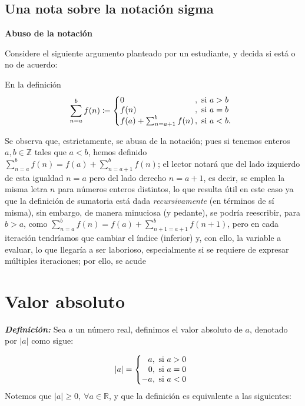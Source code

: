\documentclass[11pt]{article}
\newcommand{\Z}{\mathbb{Z}}
\newcommand{\R}{\mathbb{R}}
\newcommand{\defined}{\coloneqq}
\newcommand{\bfit}[1]{\textbf{\textit{#1}}}
\begin{document}
\subsection*{Una nota sobre la notación sigma}

\textbf{Abuso de la notación}

Considere el siguiente argumento planteado por un estudiante, y decida si está o no de acuerdo:

En la definición     \[
  \sum_{n=a}^{b} f(n) \defined \left\{
 \begin{array}{@{}l@{\thinspace}l}
  0 &,  \ \text{si}  \ a>b\\
  f(n) &,  \ \text{si}  \ a=b\\
  f(a) + \sum_{n=a+1}^{b} f(n) &,  \ \text{si}  \ a<b.
 \end{array} \right. \]

Se observa que, estrictamente, se abusa de la notación; pues si tenemos enteros $a,b\in \Z$ tales que $a<b$, hemos definido $\sum_{n=a}^{b} f(n) = f(a) + \sum_{n=a+1}^{b}f(n)$; el lector notará que del lado izquierdo de esta igualdad $n=a$ pero del lado derecho $n=a+1$, es decir, se emplea la misma letra $n$ para números enteros distintos, lo que resulta útil en este caso ya que la definición de sumatoria está dada \textit{recursivamente} (en términos de sí misma), sin embargo, de manera minuciosa (y pedante), se podría reescribir, para $b>a$, como $\sum_{n=a}^{b}f(n) = f(a) + \sum_{n+1=a+1}^{b}f(n+1)$, pero en cada iteración tendríamos que cambiar el índice (inferior) y, con ello, la variable a evaluar, lo que llegaría a ser laborioso, especialmente si se requiere de expresar múltiples iteraciones; por ello, se acude %

\section*{Valor absoluto}

\bfit{Definición:}  Sea $a$ un número real, definimos el valor absoluto de $a$, denotado por $|a|$ como sigue:

 \[
  |a| = \left\{
 \begin{array}{@{}r@{\thinspace}l}
  a, &  \ \text{si}  \ a>0\\
  0, &  \ \text{si}  \ a=0\\
  -a, & \  \text{si} \  a<0
 \end{array} \right. \]
Notemos que $|a|\geq 0, \ \forall a\in \R$, y que la definición es equivalente a las siguientes:
\end{document}
